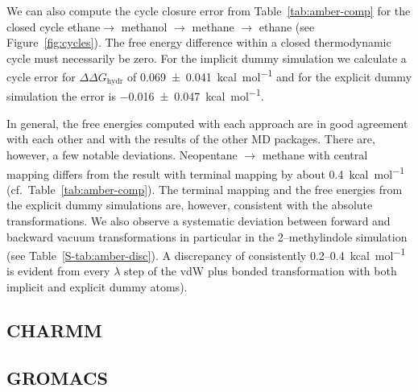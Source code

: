 \documentclass[journal=jctcce,manuscript=article]{achemso}
\begin{document}
We can also compute the cycle closure error from Table~\ref{tab:amber-comp} for the closed cycle ethane$ \rightarrow$ methanol $\rightarrow$ methane $\rightarrow$ ethane (see Figure~\ref{fig:cycles}).  The free energy difference within a closed thermodynamic cycle must necessarily be zero.  For the implicit dummy simulation we calculate a cycle error for $\Delta\Delta G_\mathrm{hydr}$ of \SI{0.069+-0.041}{kcal.mol^{-1}} and for the explicit dummy simulation the error is \SI{-0.016+-0.047}{kcal.mol^{-1}}.

In general, the free energies computed with each approach are in good agreement 
with each other and with the results of the other MD packages.  There are, 
however, a few notable deviations.  Neopentane $\rightarrow$ methane with 
central mapping differs from the result with terminal mapping by about 
\SI{0.4}{kcal.mol^{-1}} (cf.\ Table~\ref{tab:amber-comp}).
The terminal mapping and the free energies from the explicit dummy simulations 
are, however, consistent with the absolute transformations.  We also observe a 
systematic deviation between forward and backward vacuum transformations in 
particular in the 2--methylindole simulation (see Table~\ref{S-tab:amber-disc}).
A discrepancy of consistently 0.2--\SI{0.4}{kcal.mol^{-1}} is evident from every $\lambda$ step of the vdW plus bonded transformation with both implicit and explicit dummy atoms).


\subsection{CHARMM}
\label{sec:charmm-results}



\subsection{GROMACS}
\label{sec:gromacs-results}



\end{document}
